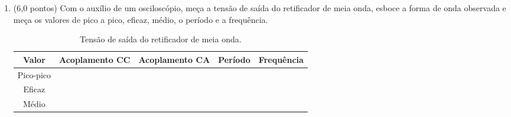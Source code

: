 \documentclass[11pt]{article} %
\begin{document}
\begin{enumerate}
\item (6,0 pontos) Com o auxílio de um osciloscópio, meça a tensão de saída do retificador de meia onda, esboce a forma de onda observada e meça os valores de pico a pico, eficaz, médio, o período e a frequência.

\begin{figure}[!h]
	\centering
\end{figure}

\begin{table}[!h]
\centering
\caption{Tensão de saída do retificador de meia onda.}
\begin{tabular}{|c|c|c|c|c|}
\hline
Valor & Acoplamento CC & Acoplamento CA & Período & Frequência\\\hline
Pico-pico & & & & \\\cline{1-3}
Eficaz & & & & \\\cline{1-3}
Médio & & & & \\\hline
\end{tabular}
\end{table}

%

%

\end{enumerate}
\end{document}
